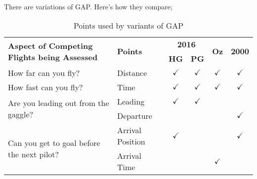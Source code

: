 \documentclass[gap.tex]{subfiles}
\begin{document}
There are variations of GAP. Here's how they compare;
\begin{table}[!ht]
    \begin{tabularx}{\textwidth}{|X|l|c|c|c|c|}
    \hline
         \multirow{2}{*}{\textbf{Aspect of Competing Flights being Assessed}}
         & \multirow{2}{*}{\textbf{Points}}
         & \multicolumn{2}{c|}{\textbf{2016}}
         & \multirow{2}{*}{\textbf{Oz}}
         & \multirow{2}{*}{\textbf{2000}}
         \\
    \cline{3-4}
         &
         & \textbf{HG}
         & \textbf{PG}
         &
         &
         \\
    \hline
        How far can you fly?
        & Distance
        & $\checkmark$
        & $\checkmark$
        & $\checkmark$
        & $\checkmark$
        \\
    \hline
        How fast can you fly?
        & Time
        & $\checkmark$
        & $\checkmark$
        & $\checkmark$
        & $\checkmark$
        \\
    \hline
        \multirow{2}{*}{Are you leading out from the gaggle?}
        & Leading
        & $\checkmark$
        & $\checkmark$
        &
        &
        \\
    \cline{2-6}
        & Departure
        &
        &
        &
        & $\checkmark$
        \\
    \hline
        \multirow{2}{*}{Can you get to goal before the next pilot?}
        & Arrival Position
        & $\checkmark$
        &
        &
        & $\checkmark$
        \\
    \cline{2-6}
        & Arrival Time
        &
        &
        & $\checkmark$
        &
        \\
    \hline
    \end{tabularx}
    \caption{Points used by variants of GAP}
    \label{tab:gap-variants}
\end{table}
\end{document}
